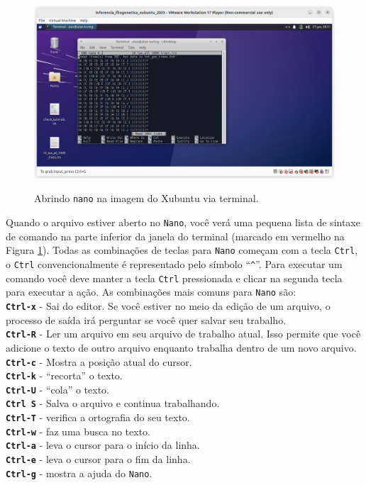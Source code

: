 \begin{refsection}
  \begin{figure}[H]
      {\includegraphics[scale=0.35]{figures/tut2/nano.jpg}}
      {\caption[\textit{Abrindo \texttt{nano} }]{Abrindo \texttt{nano} na imagem do Xubuntu via terminal.}\label{tut2:fig:nano}}
  \end{figure}


Quando o arquivo estiver aberto no \texttt{Nano}, você verá uma pequena lista de sintaxe de comando na parte inferior da janela do terminal (marcado em vermelho na Figura \ref{tut2:fig:nano}). Todas as combinações de teclas para \texttt{Nano} começam com a tecla \texttt{Ctrl}, o \texttt{Ctrl} convencionalmente é representado pelo símbolo ``\texttt{\^{}}''. Para executar um comando você deve manter a tecla \texttt{Ctrl} pressionada e clicar na segunda tecla para executar a ação. As combinações mais comuns para \texttt{Nano} são:\\

\noindent\textbf{\texttt{Ctrl-x}} - Sai do editor. Se você estiver no meio da edição de um arquivo, o processo de saída irá perguntar se você quer salvar seu trabalho.\\
\textbf{\texttt{Ctrl-R}} - Ler um arquivo em seu arquivo de trabalho atual. Isso permite que você adicione o texto de outro arquivo enquanto trabalha dentro de um novo arquivo.\\
\textbf{\texttt{Ctrl-c}} - Mostra a posição atual do cursor.\\
\textbf{\texttt{Ctrl-k}} - ``recorta'' o texto.\\
\textbf{\texttt{Ctrl-U}} - ``cola'' o texto.\\
\textbf{\texttt{Ctrl S}} - Salva o arquivo e continua trabalhando.\\
\textbf{\texttt{Ctrl-T}} - verifica a ortografia do seu texto.\\
\textbf{\texttt{Ctrl-w}} - faz uma busca no texto.\\
\textbf{\texttt{Ctrl-a}} - leva o cursor para o início da linha.\\
\textbf{\texttt{Ctrl-e}} - leva o cursor para o fim da linha.\\
\textbf{\texttt{Ctrl-g}} - mostra a ajuda do \texttt{Nano}.\\


\end{refsection}
